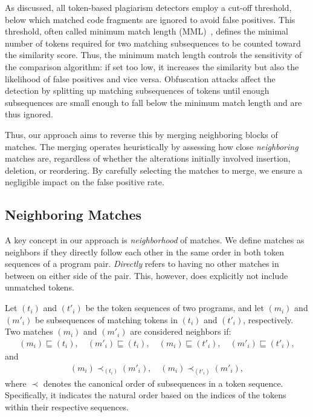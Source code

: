 As discussed, all token-based plagiarism detectors employ a cut-off threshold, below which matched code fragments are ignored to avoid false positives. This threshold, often called minimum match length (MML)~\cite{Saglam2022}, defines the minimal number of tokens required for two matching subsequences to be counted toward the similarity score.
Thus, the minimum match length controls the sensitivity of the comparison algorithm: if set too low, it increases the similarity but also the likelihood of false positives and vice versa.
Obfuscation attacks affect the detection by splitting up matching subsequences of tokens until enough subsequences are small enough to fall below the minimum match length and are thus ignored.

Thus, our approach aims to reverse this by merging neighboring blocks of matches. The merging operates heuristically by assessing how close \textit{neighboring} matches are, regardless of whether the alterations initially involved insertion, deletion, or reordering. By carefully selecting the matches to merge, we ensure a negligible impact on the false positive rate.

\subsection{Neighboring Matches}
A key concept in our approach is \textit{neighborhood} of matches.
We define matches as neighbors if they directly follow each other in the same order in both token sequences of a program pair. \textit{Directly} refers to having no other matches in between on either side of the pair. This, however, does explicitly not include unmatched tokens.

\begin{theorem}\label{def:neighbors}
Let \( (t_i) \) and \( (t'_i) \) be the token sequences of two programs, and let \( (m_i) \) and \( (m'_i) \) be subsequences of matching tokens in \( (t_i) \) and \( (t'_i) \), respectively. Two matches \( (m_i) \) and \( (m'_i) \) are considered neighbors if:
\begin{align*}
(m_i) \sqsubseteq (t_i), \quad (m'_i) \sqsubseteq (t_i), \quad (m_i) \sqsubseteq (t'_i), \quad (m'_i) \sqsubseteq (t'_i),
\end{align*}
and
\begin{align*}
(m_i) \prec_{(t_i)} (m'_i), \quad (m_i) \prec_{(t'_i)} (m'_i),
\end{align*}
where \( \prec \) denotes the canonical order of subsequences in a token sequence. Specifically, it indicates the natural order based on the indices of the tokens within their respective sequences.
\end{theorem}

